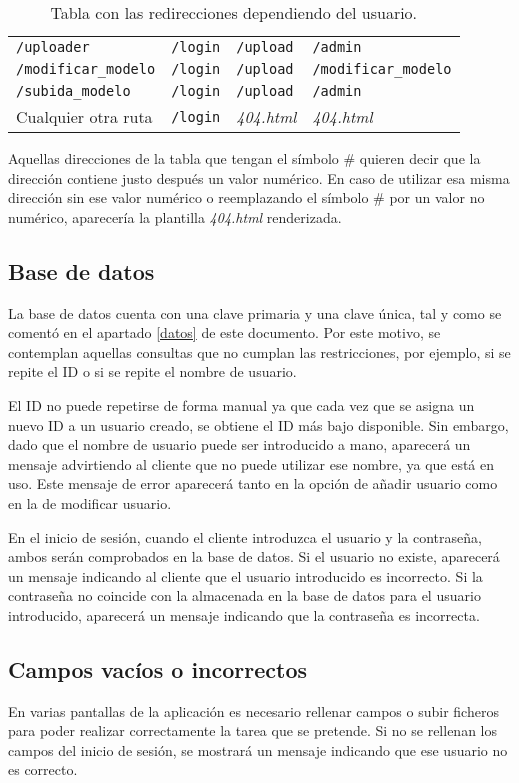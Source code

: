 \begin{table}[h]
\begin{center}
\begin{tabular}{ l l l l }
			\texttt{/uploader} & \texttt{/login} & \texttt{/upload} & \texttt{/admin} \\
			\texttt{/modificar\_modelo} & \texttt{/login} & \texttt{/upload} & \texttt{/modificar\_modelo} \\ 
			\texttt{/subida\_modelo} & \texttt{/login} & \texttt{/upload} & \texttt{/admin} \\
			Cualquier otra ruta & \texttt{/login} & \textit{404.html} & \textit{404.html} \\ \bottomrule
\end{tabular}
		\caption{Tabla con las redirecciones dependiendo del usuario.}
		\label{tab:redirecciones}
	\end{center}
\end{table}

Aquellas direcciones de la tabla que tengan el símbolo \# quieren decir que la dirección contiene justo después un valor numérico. En caso de utilizar esa misma dirección sin ese valor numérico o reemplazando el símbolo \# por un valor no numérico, aparecería la plantilla \textit{404.html} renderizada.

\subsection{Base de datos}
La base de datos cuenta con una clave primaria y una clave única, tal y como se comentó en el apartado \ref{datos} de este documento. Por este motivo, se contemplan aquellas consultas que no cumplan las restricciones, por ejemplo, si se repite el ID o si se repite el nombre de usuario.

El ID no puede repetirse de forma manual ya que cada vez que se asigna un nuevo ID a un usuario creado, se obtiene el ID más bajo disponible. Sin embargo, dado que el nombre de usuario puede ser introducido a mano, aparecerá un mensaje advirtiendo al cliente que no puede utilizar ese nombre, ya que está en uso. Este mensaje de error aparecerá tanto en la opción de añadir usuario como en la de modificar usuario.

En el inicio de sesión, cuando el cliente introduzca el usuario y la contraseña, ambos serán comprobados en la base de datos. Si el usuario no existe, aparecerá un mensaje indicando al cliente que el usuario introducido es incorrecto. Si la contraseña no coincide con la almacenada en la base de datos para el usuario introducido, aparecerá un mensaje indicando que la contraseña es incorrecta.

\subsection{Campos vacíos o incorrectos}
En varias pantallas de la aplicación es necesario rellenar campos o subir ficheros para poder realizar correctamente la tarea que se pretende. Si no se rellenan los campos del inicio de sesión, se mostrará un mensaje indicando que ese usuario no es correcto.

